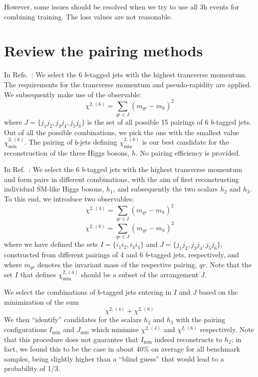 \documentclass[12pt]{article}
\begin{document}
        However, some issues should be resolved when we try to use all 3h events for combining training. The loss values are not reasonable.
\section{Review the pairing methods}%
\label{sec:review_the_pairing_methods}
    In Refs.~\cite{Papaefstathiou:2019ofh, Papaefstathiou:2023uum}: We select the 6 $b$-tagged jets with the highest transverse momentum. The requirements for the transverse momentum and pseudo-rapidity are applied. We subsequently make use of the observable:
    \begin{equation}
        \chi^{2,(6)} = \sum_{qr\in J} (m_{qr} - m_h)^2
    \end{equation}
    where $J = \{j_1j_2,j_3j_4,j_5j_6\} $ is the set of all possible 15 pairings of 6 $b$-tagged jets. Out of all the possible combinations, we pick the one with the smallest value $\chi_{\text{min}}^{2,(6)}$. The pairing of $b$-jets defining $\chi_{\text{min}}^{2,(6)}$ is our best candidate for the reconstruction of the three Higgs bosons, $h$. No pairing efficiency is provided.

    In Ref.~\cite{Papaefstathiou:2020lyp}: We select the 6 $b$-tagged jets with the highest transverse momentum and form pairs in different combinations, with the aim of first reconstructing individual SM-like Higgs bosons, $h_1$, and subsequently the two scalars $h_2$ and $h_3$. To this end, we introduce two observables:
    \begin{equation}
        \chi^{2,(4)} = \sum_{qr\in I} (m_{qr} - m_h)^2
    \end{equation}
    \begin{equation}
        \chi^{2,(6)} = \sum_{qr\in J} (m_{qr} - m_h)^2
    \end{equation}
    where we have defined the sets $I = \{i_1i_2,i_3i_4\}$ and $J = \{j_1j_2,j_3j_4,j_5j_6\}$, constructed from different pairings of 4 and 6 $b$-tagged jets, respectively, and where $m_{qr}$ denotes the invariant mass of the respective pairing, $qr$. Note that the set $I$ that defines $\chi_{\text{min}}^{2,(4)}$ should be a subset of the arrangement $J$.

    We select the combinations of $b$-tagged jets entering in $I$ and $J$ based on the minimization of the sum
    \begin{equation}
        \chi^{2,(4)} + \chi^{2,(6)}
    \end{equation}
    We then ``identify'' candidates for the scalars $h_2$ and $h_3$ with the pairing configurations $I_{\text{min}}$ and $J_{\text{min}}$ which minimise $\chi^{2,(4)}$ and $\chi^{2,(6)}$ respectively. Note that this procedure does not guarantee that $I_{\text{min}}$ indeed reconstructs to $h_2$; in fact, we found this to be the case in about 40\% on average for all benchmark samples, being slightly higher than a ``blind guess'' that would lead to a probability of 1/3.
\end{document}
